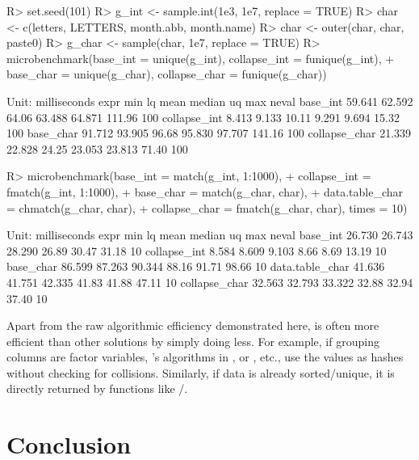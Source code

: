 \documentclass[article]{jss}
\begin{document}
\begin{Schunk}
\begin{Sinput}
R> set.seed(101)
R> g_int <- sample.int(1e3, 1e7, replace = TRUE)
R> char <- c(letters, LETTERS, month.abb, month.name)
R> char <- outer(char, char, paste0)
R> g_char <- sample(char, 1e7, replace = TRUE)
R> microbenchmark(base_int = unique(g_int), collapse_int = funique(g_int),
+              base_char = unique(g_char), collapse_char = funique(g_char))
\end{Sinput}
\begin{Soutput}
Unit: milliseconds
          expr    min     lq  mean median     uq    max neval
      base_int 59.641 62.592 64.06 63.488 64.871 111.96   100
  collapse_int  8.413  9.133 10.11  9.291  9.694  15.32   100
     base_char 91.712 93.905 96.68 95.830 97.707 141.16   100
 collapse_char 21.339 22.828 24.25 23.053 23.813  71.40   100
\end{Soutput}
\begin{Sinput}
R> microbenchmark(base_int = match(g_int, 1:1000),
+                 collapse_int = fmatch(g_int, 1:1000),
+                 base_char = match(g_char, char),
+                 data.table_char = chmatch(g_char, char),
+                 collapse_char = fmatch(g_char, char), times = 10)
\end{Sinput}
\begin{Soutput}
Unit: milliseconds
            expr    min     lq   mean median    uq   max neval
        base_int 26.730 26.743 28.290  26.89 30.47 31.18    10
    collapse_int  8.584  8.609  9.103   8.66  8.69 13.19    10
       base_char 86.599 87.263 90.344  88.16 91.71 98.66    10
 data.table_char 41.636 41.751 42.335  41.83 41.88 47.11    10
   collapse_char 32.563 32.793 33.322  32.88 32.94 37.40    10
\end{Soutput}
\end{Schunk}
%
Apart from the raw algorithmic efficiency demonstrated here,  is often more efficient than other solutions by simply doing less. For example, if grouping columns are factor variables, 's algorithms in ,  or , etc., use the values as hashes without checking for collisions. Similarly, if data is already sorted/unique, it is directly returned by functions like /.

\newpage

\section{Conclusion} \label{sec:conclusion}
\end{document}
